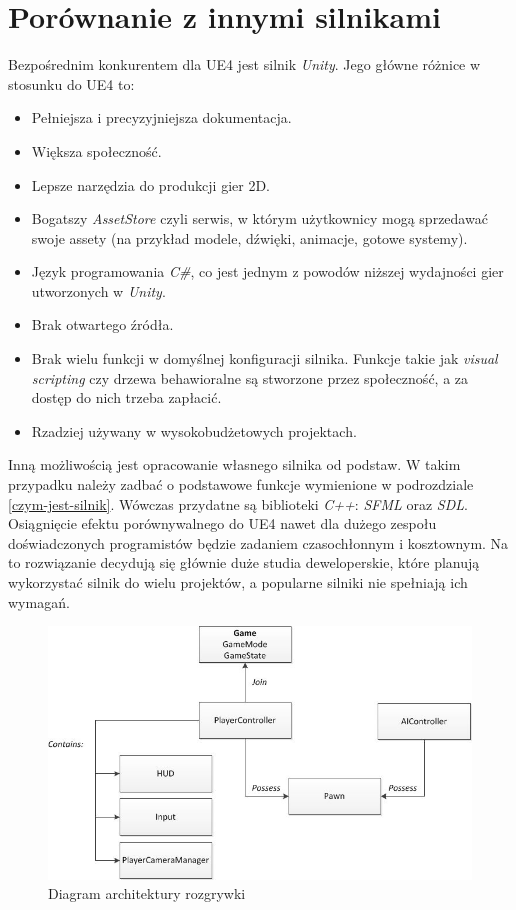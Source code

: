 \documentclass[multip]{SGGW-thesis}
\begin{document}
\section{Porównanie z innymi silnikami}
Bezpośrednim konkurentem dla UE4 jest silnik {\em Unity}. Jego główne różnice w stosunku do UE4 to:
\begin{itemize}
\item Pełniejsza i precyzyjniejsza dokumentacja.
\item Większa społeczność.
\item Lepsze narzędzia do produkcji gier 2D.
\item Bogatszy {\em AssetStore} czyli serwis, w którym użytkownicy mogą sprzedawać swoje assety (na przykład modele, dźwięki, animacje, gotowe systemy).
\item Język programowania {\em C\#}, co jest jednym z powodów niższej wydajności gier utworzonych w {\em Unity}.
\item Brak otwartego źródła.
\item Brak wielu funkcji w domyślnej konfiguracji silnika. Funkcje takie jak {\em visual scripting} czy drzewa behawioralne są stworzone przez społeczność, a za dostęp do nich trzeba zapłacić.
\item Rzadziej używany w wysokobudżetowych projektach.
\end{itemize}
Inną możliwością jest opracowanie własnego silnika od podstaw. W takim przypadku należy zadbać o podstawowe funkcje wymienione w podrozdziale \ref{czym-jest-silnik}. Wówczas przydatne są biblioteki {\em C++}: {\em SFML} oraz {\em SDL}. Osiągnięcie efektu porównywalnego do UE4 nawet dla dużego zespołu doświadczonych programistów będzie zadaniem czasochłonnym i kosztownym. Na to rozwiązanie decydują się głównie duże studia deweloperskie, które planują wykorzystać silnik do wielu projektów, a popularne silniki nie spełniają ich wymagań.

\begin{figure}
	\centering
		\includegraphics[width=1\textwidth]{figures/gameplay_chart.jpg}
	\caption{Diagram architektury rozgrywki}
	\label{fig-gameplay-chart}
\end{figure}
\end{document}

